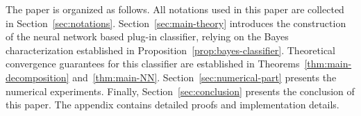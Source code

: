 \documentclass{article}
\theoremstyle{plain}
\theoremstyle{definition}
\theoremstyle{remark}
\begin{document}
The paper is organized as follows. All notations used in this paper are collected in Section~\ref{sec:notations}. Section~\ref{sec:main-theory} introduces the construction of the neural network based plug-in classifier, relying on the Bayes characterization established in Proposition~\ref{prop:bayes-classifier}. Theoretical convergence guarantees for this classifier are established in Theorems~\ref{thm:main-decomposition} and~\ref{thm:main-NN}. Section~\ref{sec:numerical-part} presents the numerical experiments. Finally, Section~\ref{sec:conclusion} presents the conclusion of this paper. The appendix contains detailed proofs and implementation details. %







\end{document}
